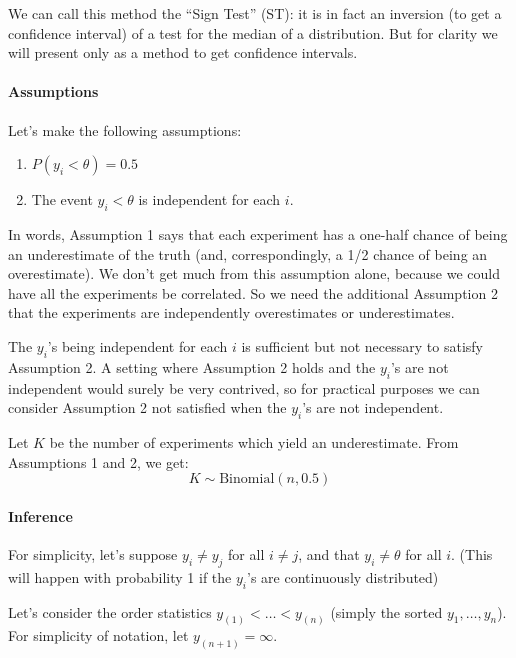 \documentclass[12pt]{article}
\begin{document}
We can call this method the ``Sign Test'' (ST): it is in fact an inversion (to get a confidence interval) of a test for the median of a distribution. But for clarity we will present only as a method to get confidence intervals.

\paragraph{Assumptions}\label{assumptions-3}

Let's make the following assumptions:

\begin{enumerate}
\item $P(y_i<\theta)=0.5$
\item The event $y_i<\theta$ is independent for each $i$.
\end{enumerate}

In words, Assumption 1 says that each experiment has a one-half chance of being an underestimate of the truth (and, correspondingly, a 1/2 chance of being an overestimate). We don't get much from this assumption alone, because we could have all the experiments be correlated. So we need the additional Assumption 2 that the experiments are independently overestimates or underestimates.

The $y_i$'s being independent for each $i$ is sufficient but not necessary to satisfy Assumption 2. A setting where Assumption 2 holds and the $y_i$'s are not independent would surely be very contrived, so for practical purposes we can consider Assumption 2 not satisfied when the $y_i$'s are not independent.

Let $K$ be the number of experiments which yield an underestimate. From Assumptions 1 and 2, we get:
\begin{equation*}K\sim\mathrm{Binomial}(n,0.5)\end{equation*}

\paragraph{Inference}\label{inference-3}

For simplicity, let's suppose $y_i\neq y_j$ for all $i\neq j$, and that $y_i\neq \theta$ for all $i$. (This will happen with probability 1 if the $y_i$'s are continuously distributed)

Let's consider the order statistics $y_{(1)}<\ldots< y_{(n)}$ (simply the sorted $y_1,\ldots,y_n$). For simplicity of notation, let $y_{(n+1)}=\infty$.
\end{document}
